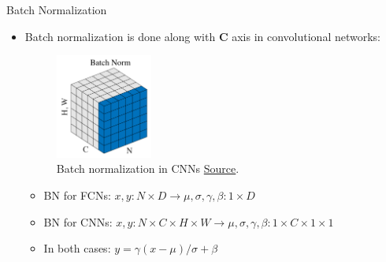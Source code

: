 \begin{frame}{Batch Normalization}
\begin{itemize}
\item Batch normalization is done along with \textbf{C} axis in convolutional networks:
\begin{figure}
	\centering
	\includegraphics[width=0.3\textwidth]{Images/batch normalization for cnn.png}
	\caption{Batch normalization in CNNs \href{https://arxiv.org/pdf/1803.08494.pdf}{Source}.}
	\label{fig:batch normalization for cnn}
\end{figure}
\begin{itemize}
\item BN for FCNs: $x, y: N\times D \rightarrow \mu, \sigma, \gamma, \beta: 1\times D$
\item BN for CNNs: $x, y: N\times C \times H \times W \rightarrow \mu, \sigma, \gamma, \beta: 1\times C \times 1 \times 1$
\item In both cases: $y = \gamma (x - \mu) / \sigma + \beta$
\end{itemize}
\end{itemize}

\end{frame}



